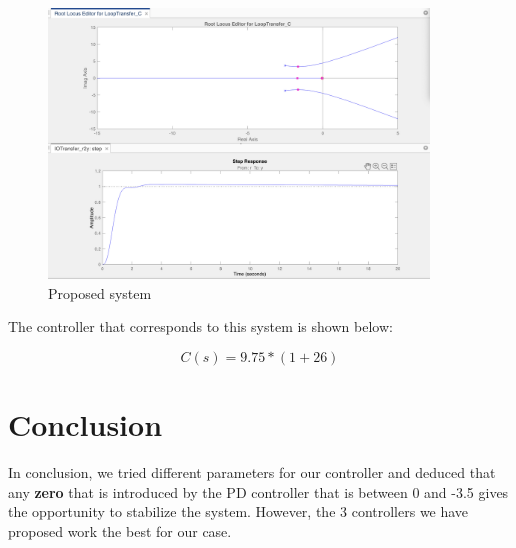 \begin{figure}[H]
    \centering
    \includegraphics[width=0.9\textwidth]{images/fisek_response.png}
    \caption{Proposed system}
    \label{fig:fisek}
\end{figure}

The controller that corresponds to this system is shown below:

\begin{equation}
        C(s) = 9.75 * (1 + 26)
\end{equation}


\section{Conclusion}


In conclusion, we tried different parameters for our controller and deduced that any \textbf{zero} that is introduced by the PD controller that is between 0 and -3.5 gives the opportunity to stabilize the system. However, the 3 controllers we have proposed work the best for our case.